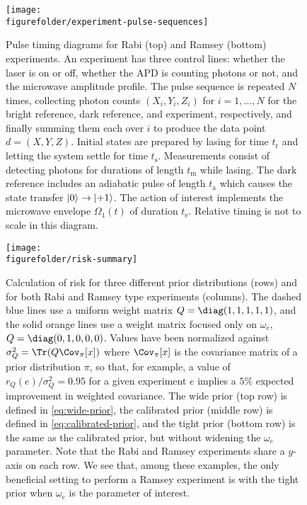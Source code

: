 \documentclass[aps,nofootinbib,twocolumn,superscriptaddress]{revtex4}
\newcommand{\figurefolder}{../fig}
\newcommand{\mps}{x}
\newcommand{\eps}{e}
\newcommand{\data}{d}
\newcommand{\te}{t_\text{e}}
\newcommand{\tm}{t_\text{m}}
\begin{document}
\begin{figure}[t]
    \texttt{[image: \\figurefolder/experiment-pulse-sequences]}
    \caption{Pulse timing diagrams for Rabi (top) and Ramsey
        (bottom) experiments. An experiment has three control lines:
        whether the laser is on or off, whether the APD is counting
        photons or not, and the microwave amplitude profile.
        The pulse sequence is repeated $N$ times, collecting
        photon counts $(X_i,Y_i,Z_i)$ for $i=1,...,N$ for the bright reference,
        dark reference, and experiment, respectively, and finally summing them
        each over $i$ to produce the data point $\data=(X,Y,Z)$.
        Initial states are prepared by lasing for time $t_\text{r}$
        and letting the system settle for time $t_\text{s}$.
        Measurements consist of detecting photons for
        durations of length $\tm$ while lasing.
        The dark reference includes an adiabatic pulse of length
        $t_\text{a}$ which causes the state
        transfer $\ket{0}\rightarrow\ket{+1}$.
        The action of interest implements the microwave envelope
        $\Omega_1(t)$ of duration $\te$.
        Relative timing is not to scale in this diagram.
        }
    \label{fig:experiment-pulse-sequences}
\end{figure}

\begin{figure}
    \texttt{[image: \\figurefolder/risk-summary]}
    \caption{Calculation of risk for three different prior distributions (rows)
        and for both Rabi and Ramsey type experiments (columns).
        The dashed blue lines use a uniform weight matrix $Q=\diag(1,1,1,1,1)$,
        and the solid orange lines use a weight matrix focused only on $\omega_e$,
        $Q=\diag(0,1,0,0,0)$.
        Values have been normalized against $\sigma_Q^2=\Tr(Q\Cov_{\pi}[\mps])$
        where $\Cov_{\pi}[\mps]$ is the covariance matrix of a prior
        distribution $\pi$,
        so that, for example, a value of $r_Q(\eps)/\sigma_Q^2=0.95$ for a given
        experiment $\eps$
        implies a $5\%$ expected improvement in weighted covariance.
        The wide prior (top row) is defined in \autoref{eq:wide-prior}, the
        calibrated prior (middle row) is defined in \autoref{eq:calibrated-prior},
        and the tight prior (bottom row) is the same as the calibrated prior, but
        without widening the $\omega_e$ parameter.
        Note that the Rabi and Ramsey experiments share a $y$-axis on each row.
        We see that, among these examples, the only beneficial setting to
        perform a Ramsey experiment is with the tight prior when $\omega_e$
        is the parameter of interest.
        }
    \label{fig:risk-summary}
\end{figure}
\end{document}
